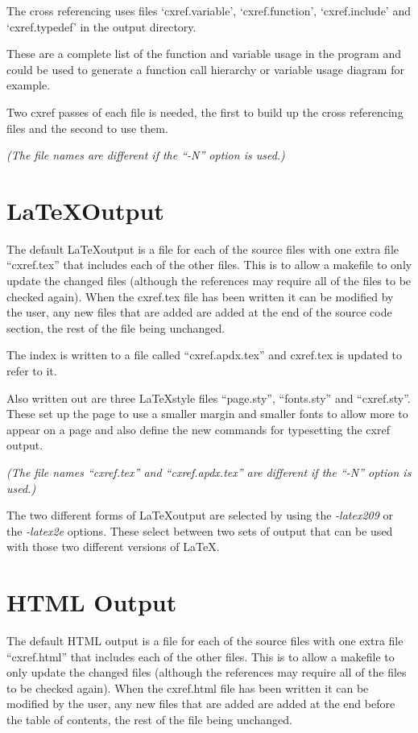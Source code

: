 \documentclass{report}
\begin{document}
The cross referencing uses files `cxref.variable', `cxref.function',
`cxref.include' and `cxref.typedef' in the output directory.

These are a complete list of the function and variable usage in the program and
could be used to generate a function call hierarchy or variable usage diagram
for example.

Two cxref passes of each file is needed, the first to build up the cross
referencing files and the second to use them.

{\it (The file names are different if the ``-N'' option is used.)}

\section{\LaTeX Output}

The default \LaTeX output is a file for each of the source files with one extra
file ``cxref.tex'' that includes each of the other files.  This is to allow a
makefile to only update the changed files (although the references may require
all of the files to be checked again).  When the cxref.tex file has been written
it can be modified by the user, any new files that are added are added at the
end of the source code section, the rest of the file being unchanged.

The index is written to a file called ``cxref.apdx.tex'' and cxref.tex is updated
to refer to it.

Also written out are three \LaTeX style files ``page.sty'', ``fonts.sty'' and
``cxref.sty''.  These set up the page to use a smaller margin and smaller fonts to
allow more to appear on a page and also define the new commands for typesetting
the cxref output.

{\it (The file names ``cxref.tex'' and ``cxref.apdx.tex'' are different if the ``-N''
option is used.)}

The two different forms of \LaTeX output are selected by using the {\it -latex209} or
the {\it -latex2e} options.  These select between two sets of output that can be used
with those two different versions of \LaTeX.

\section{HTML Output}

The default HTML output is a file for each of the source files with one extra
file ``cxref.html'' that includes each of the other files.  This is to allow a
makefile to only update the changed files (although the references may require
all of the files to be checked again).  When the cxref.html file has been
written it can be modified by the user, any new files that are added are added
at the end before the table of contents, the rest of the file being unchanged.
\end{document}

